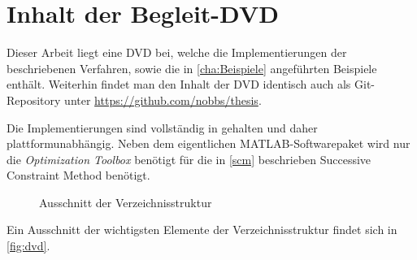 \documentclass[../main.tex]{subfiles}
\begin{document}
\chapter{Inhalt der Begleit-DVD} %
\label{cha:inhalt_der_begleit_dvd}

Dieser Arbeit liegt eine DVD bei, welche die Implementierungen der beschriebenen Verfahren, sowie die in \autoref{cha:Beispiele} angeführten Beispiele enthält.
Weiterhin findet man den Inhalt der DVD identisch auch als Git-Repository unter \url{https://github.com/nobbs/thesis}.

Die Implementierungen sind vollständig in \textcite{Matlab} gehalten und daher plattformunabhängig.
Neben dem eigentlichen MATLAB-Softwarepaket wird nur die \emph{Optimization Toolbox} benötigt für die in \autoref{scm} beschrieben Successive Constraint Method benötigt.

\begin{figure}[tb]
    \caption{Ausschnitt der Verzeichnisstruktur}
    \label{fig:dvd}
\end{figure}

Ein Ausschnitt der wichtigsten Elemente der Verzeichnisstruktur findet sich in \autoref{fig:dvd}.
\end{document}
